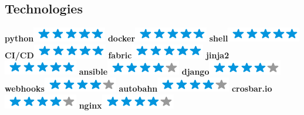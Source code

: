\documentclass[]{friggeri-cv}
\begin{document}
\begin{aside}
    \section{Technologies}
        \textbf{python}\includegraphics[scale=0.40]{img/5stars.png}
        \textbf{docker}\includegraphics[scale=0.40]{img/5stars.png}
        \textbf{shell}\includegraphics[scale=0.40]{img/5stars.png}
        \textbf{CI/CD}\includegraphics[scale=0.40]{img/5stars.png}
        \textbf{fabric}\includegraphics[scale=0.40]{img/5stars.png}
        \textbf{jinja2}\includegraphics[scale=0.40]{img/5stars.png}
        \textbf{ansible}\includegraphics[scale=0.40]{img/4stars.png}
        \textbf{django}\includegraphics[scale=0.40]{img/4stars.png}
        \textbf{webhooks}\includegraphics[scale=0.40]{img/4stars.png}
        \textbf{autobahn}\includegraphics[scale=0.40]{img/4stars.png}
        \textbf{crosbar.io}\includegraphics[scale=0.40]{img/4stars.png}
        \textbf{nginx}\includegraphics[scale=0.40]{img/4stars.png}

\end{aside}
\end{document}

